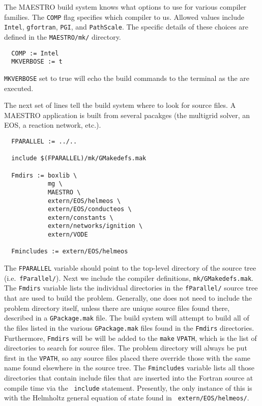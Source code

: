 The MAESTRO build system knows what options to use for various
compiler families.  The {\tt COMP} flag specifies which compiler to
us.  Allowed values include {\tt Intel}, {\tt gfortran}, {\tt PGI},
and {\tt PathScale}.  The specific details of these choices are
defined in the {\tt MAESTRO/mk/} directory.
\begin{verbatim}
  COMP := Intel
  MKVERBOSE := t
\end{verbatim}
{\tt MKVERBOSE} set to true will echo the build commands to the
terminal as the are executed.

The next set of lines tell the build system where to look for source
files.  A MAESTRO application is built from several pacakges (the
multigrid solver, an EOS, a reaction network, etc.).  
\begin{verbatim}
  FPARALLEL := ../..

  include $(FPARALLEL)/mk/GMakedefs.mak

  Fmdirs := boxlib \
            mg \
            MAESTRO \
            extern/EOS/helmeos \
            extern/EOS/conducteos \
            extern/constants \
            extern/networks/ignition \
            extern/VODE

  Fmincludes := extern/EOS/helmeos
\end{verbatim}
The {\tt FPARALLEL} variable should point to the top-level directory
of the source tree (i.e.\ {\tt fParallel/}).  Next we include the
compiler definitions, {\tt mk/GMakedefs.mak}.  The {\tt Fmdirs}
variable lists the individual directories in the {\tt fParallel/}
source tree that are used to build the problem.  Generally, one does
not need to include the problem directory itself, unless there are
unique source files found there, described in a {\tt GPackage.mak}
file.  The build system will attempt to build all of the files listed
in the various {\tt GPackage.mak} files found in the {\tt Fmdirs}
directories.  Furthermore, {\tt Fmdirs} will be will be added to the
{\tt make} {\tt VPATH}, which is the list of directories to search for
source files.  The problem directory will always be put first in the
{\tt VPATH}, so any source files placed there override those with the
same name found elsewhere in the source tree.  The {\tt Fmincludes}
variable lists all those directories that contain include files that
are inserted into the Fortran source at compile time via the {\tt
  include} statement.  Presently, the only instance of this is with
the Helmholtz general equation of state found in {\tt
  extern/EOS/helmeos/}.

